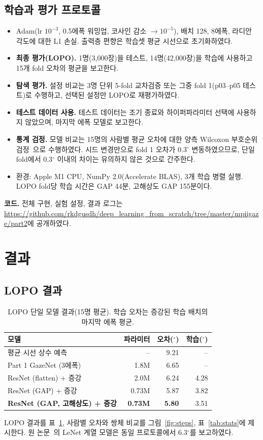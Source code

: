 \documentclass[10pt,twocolumn,a4paper]{article}
\newcommand{\dg}{^\circ}
\begin{document}
\subsection{학습과 평가 프로토콜}
\begin{itemize}
\item Adam(lr $10^{-3}$, 0.5에폭 워밍업, 코사인 감소 $\to10^{-5}$), 배치 128, 8에폭, 라디안 각도에 대한 L1 손실. 출력층 편향은 학습셋 평균 시선으로 초기화하였다.
\item \textbf{최종 평가(LOPO).} 1명(3,000장)을 테스트, 14명(42,000장)을 학습에 사용하고 15개 fold 오차의 평균을 보고한다.
\item \textbf{탐색 평가.} 설정 비교는 3명 단위 5-fold 교차검증 또는 그중 fold 1(p03--p05 테스트)로 수행하고, 선택된 설정만 LOPO로 재평가하였다.
\item \textbf{테스트 데이터 사용.} 테스트 데이터는 조기 종료와 하이퍼파라미터 선택에 사용하지 않았으며, 마지막 에폭 모델로 보고한다.
\item \textbf{통계 검정.} 모델 비교는 15명의 사람별 평균 오차에 대한 양측 Wilcoxon 부호순위 검정~\cite{wilcoxon}으로 수행하였다. 시드 변경만으로 fold 1 오차가 0.3$\dg$ 변동하였으므로, 단일 fold에서 0.3$\dg$ 이내의 차이는 유의하지 않은 것으로 간주한다.
\item 환경: Apple M1 CPU, NumPy 2.0(Accelerate BLAS), 3개 학습 병렬 실행. LOPO fold당 학습 시간은 GAP 44분, 고해상도 GAP 155분이다.
\end{itemize}
\textbf{코드.} 전체 구현, 실험 설정, 결과 로그는 \url{https://github.com/rkdgusdh/deep_learning_from_scratch/tree/master/mpiigaze/part2}에 공개하였다.

\section{결과}
\subsection{LOPO 결과}
\begin{table}[H]
\centering\small
\caption{LOPO 단일 모델 결과(15명 평균). 학습 오차는 증강된 학습 배치의 마지막 에폭 평균.}
\label{tab:lopo}
\setlength{\tabcolsep}{4pt}
\begin{tabular}{@{}lrrr@{}}
\toprule
모델 & 파라미터 & 오차($\dg$) & 학습($\dg$)\\
\midrule
평균 시선 상수 예측 & -- & 9.21 & --\\
Part 1 GazeNet (3에폭) & 1.8M & 6.65 & --\\
ResNet (flatten) + 증강 & 2.0M & 6.24 & 4.28\\
ResNet (GAP) + 증강 & 0.73M & 5.87 & 3.82\\
\textbf{ResNet (GAP, 고해상도) + 증강} & \textbf{0.73M} & \textbf{5.80} & 3.51\\
\bottomrule
\end{tabular}
\end{table}
LOPO 결과를 표~\ref{tab:lopo}, 사람별 오차와 쌍체 비교를 그림~\ref{fig:steps}, 표~\ref{tab:stats}에 제시한다. 원 논문~\cite{zhang2015}의 LeNet 계열 모델은 동일 프로토콜에서 6.3$\dg$를 보고하였다.
\end{document}
